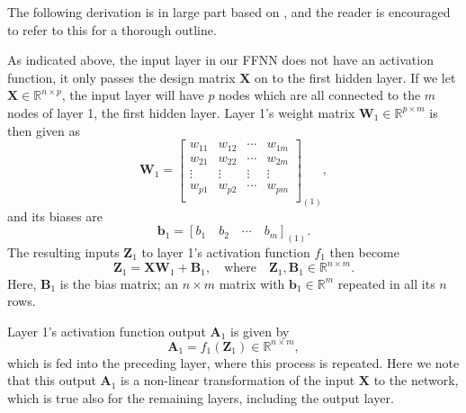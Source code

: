\documentclass[]{article}
\begin{document}
\vspace{5mm}

The following derivation is in large part based on \cite{fys-stk4155-notes}, and the reader is encouraged to refer to this for a thorough outline.

As indicated above, the input layer in our FFNN does not have an activation function, it only passes the design matrix $\mathbf{X}$ on to the first hidden layer. If we let $\mathbf{X} \in \mathbb{R}^{n \times p}$, the input layer will have $p$ nodes which are all connected to the $m$ nodes of layer 1, the first hidden layer. Layer 1's weight matrix $\mathbf{W}_1 \in \mathbb{R}^{p \times m}$ is then given as
\begin{equation}
	\mathbf{W}_1 = 
	\left[\begin{array}{cccc}
		w_{11} &w_{12} & \cdots &w_{1m} \\
		w_{21} &w_{22} & \cdots &w_{2m} \\
		\vdots &\vdots &\vdots  &\vdots \\ 
		w_{p1} &w_{p2} & \cdots &w_{pm} \\
	\end{array} \right]_{(1)},
\end{equation} 
and its biases are
\begin{equation}
	\mathbf{b}_1 = [b_1 \quad b_2 \quad \cdots \quad b_m]_{(1)}.
\end{equation}
The resulting inputs $\mathbf{Z}_1$ to layer 1's activation function $f_1$ then become
\begin{equation} \label{inputs}
	\mathbf{Z}_1 = \mathbf{X} \mathbf{W}_1 + \mathbf{B}_1, \quad \text{where} \quad \mathbf{Z}_1, \mathbf{B}_1 \in \mathbb{R}^{n \times m}.
\end{equation}
Here, $\mathbf{B}_1$ is the bias matrix; an $n \times m$ matrix with $\mathbf{b}_1 \in \mathbb{R}^m$ repeated in all its $n$ rows.

Layer 1's activation function output $\mathbf{A}_1$ is given by
\begin{equation} \label{outputs}
	\mathbf{A}_1 = f_1(\mathbf{Z}_1) \in \mathbb{R}^{n \times m},
\end{equation}
which is fed into the preceding layer, where this process is repeated. Here we note that this output $\mathbf{A}_1$ is a non-linear transformation of the input $\mathbf{X}$ to the network, which is true also for the remaining layers, including the output layer.

\vspace{5mm}
\end{document}
